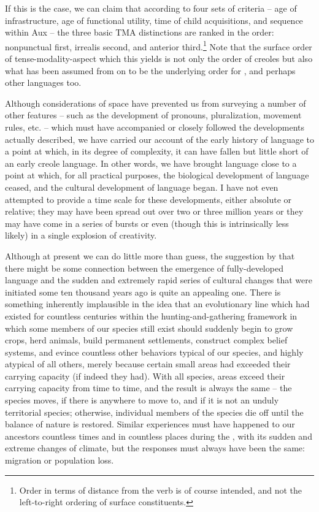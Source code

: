 If this is the case, we can claim that according to four sets of criteria -- age of infrastructure, age of functional utility, time of child acquisitions, and sequence within Aux -- the three basic TMA distinctions are ranked in the order: nonpunctual first, irrealis second, and anterior third.\footnote{Order in terms of distance from the verb is of course intended, and not the left-to-right ordering of surface constituents.} Note that the surface order of tense-modality-aspect which this yields is not only the order of creoles but also what has been assumed from \citet{Chomsky1957} on to be the underlying order for , and perhaps other languages too.

Although considerations of space have prevented us from survey\-ing a number of other features -- such as the development of pronouns, pluralization, movement rules, etc. -- which must have accompanied or closely followed the developments actually described, we have carried our account of the early history of language to a point at which, in its
degree of complexity, it can have fallen but little short of an early creole language. In other words, we have brought language close to a point at which, for all practical purposes, the biological development of language ceased, and the cultural development of language began. I have not even attempted to provide a time scale for these develop\-ments, either absolute or relative; they may have been spread out over two or three million years or they may have come in a series of bursts or even (though this is intrinsically less likely) in a single explosion of creativity.

Although at present we can do little more than guess, the suggestion by \citet{Hockett1973} that there might be some connection between the emergence of fully-developed language and the sudden and extremely rapid series of cultural changes that were initiated some ten thousand years ago is quite an appealing one. There is something inherently implausible in the idea that an evolutionary line which had existed for countless centuries within the hunting-and-gathering framework in which some members of our species still exist should suddenly begin to grow crops, herd animals, build permanent settlements, construct complex belief systems, and evince countless other behaviors typical of our species, and highly atypical of all others, merely because certain small areas had exceeded their carrying capacity (if indeed they had). With all species, areas exceed their carrying capacity from time to time, and the result is always the same -- the species moves, if there is anywhere to move to, and if it is not an unduly territorial species; otherwise, individual members of the species die off until the balance of nature is restored. Similar experiences must have happened to our ancestors countless times and in countless places during the , with its sudden and extreme changes of climate, but the responses must always have been the same: migration or population loss.

